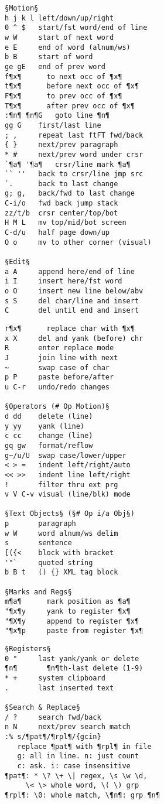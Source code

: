 \documentclass{article}
\begin{document}
\setlength{\columnsep}{7mm}
\begin{multicols}{4}
\begin{lstlisting}
§Motion§
h j k l left/down/up/right
0 ^ $   start/fst word/end of line
w W     start of next word
e E     end of word (alnum/ws)
b B     start of word
ge gE   end of prev word
f¶x¶      to next occ of ¶x¶
t¶x¶      before next occ of ¶x¶
F¶x¶      to prev occ of ¶x¶
T¶x¶      after prev occ of ¶x¶
:¶n¶ ¶n¶G   goto line ¶n¶
gg G    first/last line
; ,     repeat last ftFT fwd/back
{ }     next/prev paragraph
* #     next/prev word under crsr
`¶a¶ '¶a¶   crsr/line mark ¶a¶
`` ''   back to crsr/line jmp src
`.      back to last change
g; g,   back/fwd to last change
C-i/o   fwd back jump stack
zz/t/b  crsr center/top/bot
H M L   mv top/mid/bot screen
C-d/u   half page down/up
O o     mv to other corner (visual)

§Edit§
a A     append here/end of line
i I     insert here/fst word
o O     insert new line below/abv
s S     del char/line and insert
C       del until end and insert
\end{lstlisting}
\begin{lstlisting}
r¶x¶      replace char with ¶x¶
x X     del and yank (before) chr
R       enter replace mode
J       join line with next
~       swap case of char
p P     paste before/after
u C-r   undo/redo changes

§Operators (# Op Motion)§
d dd    delete (line)
y yy    yank (line)
c cc    change (line)
gq gw   format/reflow
g~/u/U  swap case/lower/upper
< > =   indent left/right/auto
<< >>   indent line left/right
!       filter thru ext prg
v V C-v visual (line/blk) mode

§Text Objects§ (§# Op i/a Obj§)
p       paragraph
w W     word alnum/ws delim
s       sentence
[({<    block with bracket
'"`     quoted string
b B t   () {} XML tag block

§Marks and Regs§
m¶a¶      mark position as ¶a¶
"¶x¶y     yank to register ¶x¶
"¶X¶y     append to register ¶x¶
"¶x¶p     paste from register ¶x¶
\end{lstlisting}
\begin{lstlisting}
§Registers§
0 "     last yank/yank or delete
¶n¶       ¶n¶th-last delete (1-9)
* +     system clipboard
.       last inserted text

§Search & Replace§
/ ?     search fwd/back
n N     next/prev search match
:% s/¶pat¶/¶rpl¶/{gcin}
   replace ¶pat¶ with ¶rpl¶ in file
   g: all in line. n: just count
   c: ask. i: case insensitive
¶pat¶: * \? \+ \| regex, \s \w \d,
     \< \> whole word, \( \) grp
¶rpl¶: \0: whole match, \¶n¶: grp ¶n¶


\end{lstlisting}
\end{multicols}
\end{document}
